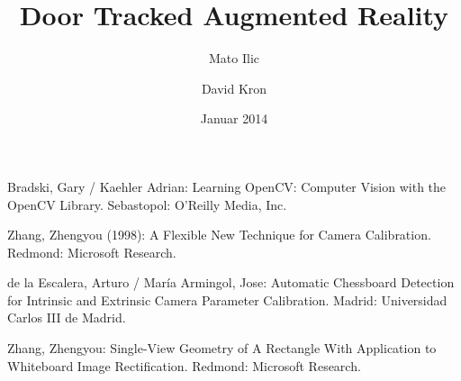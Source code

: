 \documentclass[listof=totocnumbered,bibliography=totocnumbered,12pt,oneside]{scrreprt}
\numberwithin{equation}{subsection}
\begin{document}
\pagestyle{fancy}

\subject{Bachelor-Thesis}
\title{Door Tracked Augmented Reality}
\author{Mato Ilic \and David Kron}
\date{Januar 2014}
\publishers{Betreuer: Marcus Hudritsch\\Experte: Andreas Dürsteler}

\maketitle


\newpage

\tableofcontents
\newpage


\newpage


\newpage


\newpage


\newpage


\newpage


\newpage


\newpage


\newpage


\newpage


\newpage
\begin{thebibliography}{5}

Bradski, Gary / Kaehler Adrian:
Learning OpenCV: Computer Vision with the OpenCV Library.
Sebastopol: O'Reilly Media, Inc.

Zhang, Zhengyou (1998): A Flexible New Technique for Camera Calibration. 
Redmond: Microsoft Research.

de la Escalera, Arturo / María Armingol, Jose: Automatic Chessboard Detection for Intrinsic and Extrinsic Camera Parameter Calibration. 
Madrid: Universidad Carlos III de Madrid.

Zhang, Zhengyou: Single-View Geometry of A Rectangle With Application to Whiteboard Image Rectification.
Redmond: Microsoft Research.


\end{thebibliography}
\end{document}
